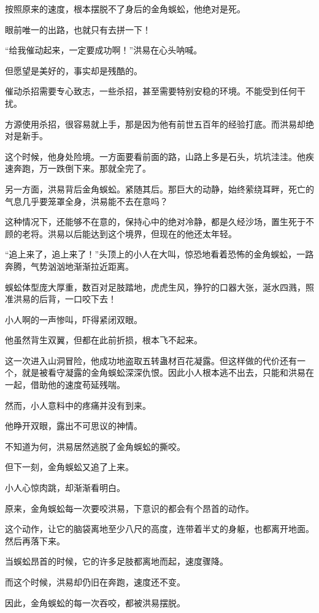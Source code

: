 \begin{this_body}
按照原来的速度，根本摆脱不了身后的金角蜈蚣，他绝对是死。

眼前唯一的出路，也就只有去拼一下！

“给我催动起来，一定要成功啊！”洪易在心头呐喊。

但愿望是美好的，事实却是残酷的。

催动杀招需要专心致志，一些杀招，甚至需要特别安稳的环境。不能受到任何干扰。

方源使用杀招，很容易就上手，那是因为他有前世五百年的经验打底。而洪易却绝对是新手。

这个时候，他身处险境。一方面要看前面的路，山路上多是石头，坑坑洼洼。他疾速奔跑，万一跌倒下来。那就全完了。

另一方面，洪易背后金角蜈蚣。紧随其后。那巨大的动静，始终萦绕耳畔，死亡的气息几乎要笼罩全身，洪易能不去在意吗？

这种情况下，还能够不在意的，保持心中的绝对冷静，都是久经沙场，置生死于不顾的老将。洪易以后能达到这个境界，但现在的他还太年轻。

“追上来了，追上来了！”头顶上的小人在大叫，惊恐地看着恐怖的金角蜈蚣，一路奔腾，气势汹汹地渐渐拉近距离。

蜈蚣体型庞大厚重，数百对足肢踏地，虎虎生风，狰狞的口器大张，涎水四溅，照准洪易的后背，一口咬下去！

小人啊的一声惨叫，吓得紧闭双眼。

他虽然背生双翼，但都在此前折损，根本飞不起来。

这一次进入山洞冒险，他成功地盗取五转蛊材百花凝露。但这样做的代价还有一个，就是被看守凝露的金角蜈蚣深深仇恨。因此小人根本逃不出去，只能和洪易在一起，借助他的速度苟延残喘。

然而，小人意料中的疼痛并没有到来。

他睁开双眼，露出不可思议的神情。

不知道为何，洪易居然逃脱了金角蜈蚣的撕咬。

但下一刻，金角蜈蚣又追了上来。

小人心惊肉跳，却渐渐看明白。

原来，金角蜈蚣每一次要咬洪易，下意识的都会有个昂首的动作。

这个动作，让它的脑袋离地至少八尺的高度，连带着半丈的身躯，也都离开地面。然后再落下来。

当蜈蚣昂首的时候，它的许多足肢都离地而起，速度骤降。

而这个时候，洪易却仍旧在奔跑，速度还不变。

因此，金角蜈蚣的每一次吞咬，都被洪易摆脱。


\end{this_body}
